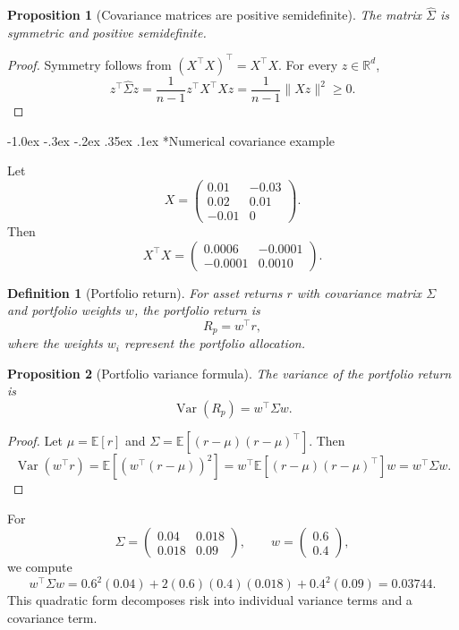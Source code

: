 \documentclass[10pt]{article}
\makeatletter
\renewcommand\subsection{\@startsection{subsection}{2}{\z@}%
  {-1.0ex \@plus -.3ex \@minus -.2ex}%
  {.35ex \@plus .1ex}%
  {\normalfont\normalsize\bfseries}}
\theoremstyle{compactdefinition}
\newtheorem{definition}{Definition}[section]
\theoremstyle{compactproposition}
\newtheorem{proposition}{Proposition}[section]
\newcommand{\R}{\mathbb{R}}
\newcommand{\Var}{\operatorname{Var}}
\makeatother
\begin{document}
\begin{proposition}[Covariance matrices are positive semidefinite]
The matrix $\widehat{\Sigma}$ is symmetric and positive semidefinite.
\end{proposition}

\begin{proof}
Symmetry follows from $(X^\top X)^\top=X^\top X$. For every $z\in\R^d$,
\[
z^\top\widehat{\Sigma}z
=\frac{1}{n-1}z^\top X^\top Xz
=\frac{1}{n-1}\|Xz\|^2\ge0.
\]
\end{proof}

\subsection*{Numerical covariance example}

Let
\[
X=
\begin{pmatrix}
0.01&-0.03\\
0.02&0.01\\
-0.01&0
\end{pmatrix}.
\]
Then
\[
X^\top X
=
\begin{pmatrix}
0.0006&-0.0001\\
-0.0001&0.0010
\end{pmatrix}.
\]

\begin{definition}[Portfolio return]
For asset returns $r$ with covariance matrix $\Sigma$ and portfolio weights $w$,
the portfolio return is
\[
R_p=w^\top r,
\]
where the weights $w_i$ represent the portfolio allocation.
\end{definition}

\begin{proposition}[Portfolio variance formula]
The variance of the portfolio return is
\[
\Var(R_p)=w^\top\Sigma w.
\]
\end{proposition}

\begin{proof}
Let $\mu=\mathbb{E}[r]$ and $\Sigma=\mathbb{E}[(r-\mu)(r-\mu)^\top]$. Then
\[
\Var(w^\top r)
=\mathbb{E}\left[(w^\top(r-\mu))^2\right]
=w^\top\mathbb{E}\left[(r-\mu)(r-\mu)^\top\right]w
=w^\top\Sigma w.
\]
\end{proof}

For
\[
\Sigma=
\begin{pmatrix}
0.04&0.018\\
0.018&0.09
\end{pmatrix},
\qquad
w=\begin{pmatrix}0.6\\0.4\end{pmatrix},
\]
we compute
\[
w^\top\Sigma w
=0.6^2(0.04)+2(0.6)(0.4)(0.018)+0.4^2(0.09)
=0.03744.
\]
This quadratic form decomposes risk into individual variance terms and a
covariance term.
\end{document}

